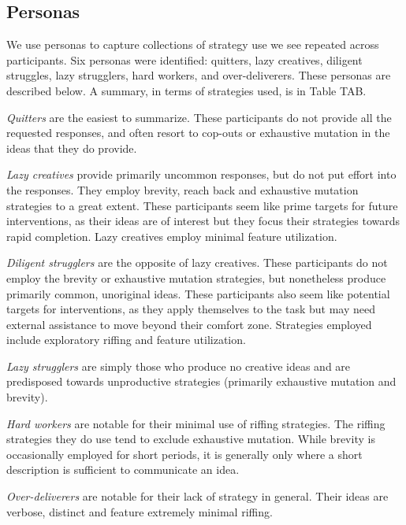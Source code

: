 \subsection{Personas}

We use personas to capture collections of strategy use we see repeated across participants. 
Six personas were identified: quitters, lazy creatives, diligent struggles, lazy strugglers, hard workers, and over-deliverers. These personas are described below. A summary, in terms of strategies used, is in Table TAB.

\emph{Quitters} are the easiest to summarize. These participants do not provide all the requested responses, and often resort to cop-outs or exhaustive mutation in the ideas that they do provide.

\emph{Lazy creatives} provide primarily uncommon responses, but do not put effort into the responses. They employ brevity, reach back and exhaustive mutation strategies to a great extent. These participants seem like prime targets for future interventions, as their ideas are of interest but they focus their strategies towards rapid completion. Lazy creatives employ minimal feature utilization.

\emph{Diligent strugglers} are the opposite of lazy creatives. These participants do not employ the brevity or exhaustive mutation strategies, but nonetheless produce primarily common, unoriginal ideas. These participants also seem like potential targets for interventions, as they apply themselves to the task but may need external assistance to move beyond their comfort zone. Strategies employed include exploratory riffing and feature utilization.

\emph{Lazy strugglers} are simply those who produce no creative ideas and are predisposed towards unproductive strategies (primarily exhaustive mutation and brevity).

\emph{Hard workers} are notable for their minimal use of riffing strategies. The riffing strategies they do use tend to exclude exhaustive mutation. While brevity is occasionally employed for short periods, it is generally only where a short description is sufficient to communicate an idea.

\emph{Over-deliverers} are notable for their lack of strategy in general. Their ideas are verbose, distinct and feature extremely minimal riffing. 

